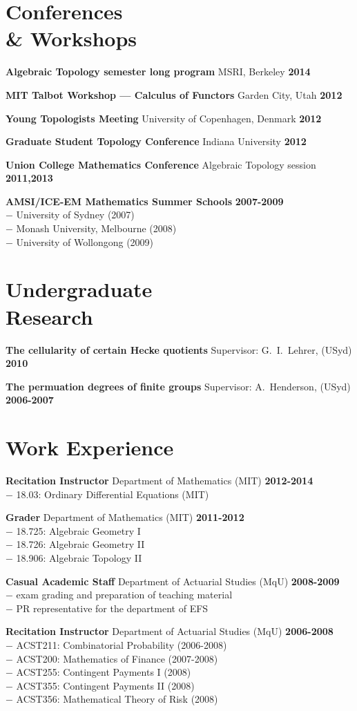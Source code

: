 \documentclass[margin,line]{resume}
\newcommand{\award}[3]{\textbf{#1} #2 \hfill \textbf{#3}
           
\vspace{-2.3mm}}
\newcommand{\twolineaward}[4]{\textbf{#1} #2 \hfill \textbf{#4}\\%
#3
           
\vspace{-2.3mm}}
\begin{document}
\begin{resume}
\vspace{2mm}
    \section{\mysidestyle Conferences \\ \& Workshops}

\award{Algebraic Topology semester long program}{MSRI, Berkeley}{2014}
\award{MIT Talbot Workshop --- Calculus of Functors}{Garden City, Utah}{2012}
\award{Young Topologists Meeting}{University of Copenhagen, Denmark}{2012}
\award{Graduate Student Topology Conference}{Indiana University}{2012}
\award{Union College Mathematics Conference}{Algebraic Topology session}{2011,2013}
\twolineaward{AMSI/ICE-EM Mathematics Summer Schools}{}{%
\phantom{space}$-$ University of Sydney (2007)\\
\phantom{space}$-$ Monash University, Melbourne (2008)\\
\phantom{space}$-$ University of Wollongong (2009)%
}{2007-2009}

\vspace{2mm}

          \section{\mysidestyle Undergraduate \\ Research}

\award{The cellularity of certain Hecke quotients}{Supervisor: G.\ I.\ Lehrer, (USyd)}{2010}
\award{The permuation degrees of finite groups}{Supervisor: A.\ Henderson, (USyd)}{2006-2007}

\vspace{2mm}
      
         \section{\mysidestyle Work Experience}
\twolineaward{Recitation Instructor}{Department of Mathematics (MIT)}{\phantom{space}$-$ 18.03: Ordinary Differential Equations (MIT)}{2012-2014}
\twolineaward{Grader}{Department of Mathematics (MIT)}{%
\phantom{space}$-$ 18.725: Algebraic Geometry I\\
\phantom{space}$-$ 18.726: Algebraic Geometry II\\
\phantom{space}$-$ 18.906: Algebraic Topology II%
}{2011-2012}
\twolineaward{Casual Academic Staff}{Department of Actuarial Studies (MqU)}{%
\phantom{space}$-$ exam grading and preparation of teaching material\\
\phantom{space}$-$ PR representative for the department of EFS%
}{2008-2009}
\twolineaward{Recitation Instructor}{Department of Actuarial Studies (MqU)}{%
\phantom{space}$-$ ACST211: Combinatorial Probability (2006-2008)\\
\phantom{space}$-$ ACST200: Mathematics of Finance (2007-2008)\\
\phantom{space}$-$ ACST255: Contingent Payments I (2008)\\
\phantom{space}$-$ ACST355: Contingent Payments II (2008)\\
\phantom{space}$-$ ACST356: Mathematical Theory of Risk (2008)%
}{2006-2008}



\end{resume}
\end{document}
